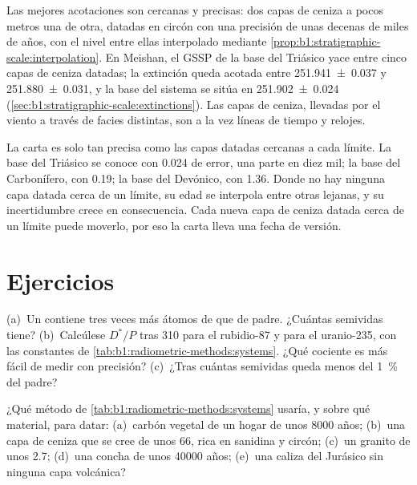 Las mejores acotaciones son cercanas y precisas: dos capas de ceniza a pocos metros una de otra, datadas en circón con una precisión de unas decenas de miles de años, con el nivel entre ellas interpolado mediante
\cref{prop:b1:stratigraphic-scale:interpolation}. En Meishan, el GSSP de la base del Triásico yace entre cinco capas de ceniza datadas; la extinción queda acotada entre \qty[uncertainty-mode=separate]{251.941(37)}{\Ma}
y \qty[uncertainty-mode=separate]{251.880(31)}{\Ma}, y la base del sistema se sitúa en \qty[uncertainty-mode=separate]{251.902(24)}{\Ma}
(\cref{sec:b1:stratigraphic-scale:extinctions}). Las capas de ceniza, llevadas por el viento a través de facies distintas, son a la vez líneas de tiempo y relojes.

La carta es solo tan precisa como las capas datadas cercanas a cada límite. La base del Triásico se conoce con \qty{0.024}{\Myr} de error, una parte en diez mil; la base del Carbonífero, con \qty{0.19}{\Myr}; la base del Devónico, con
\qty{1.36}{\Myr}. Donde no hay ninguna capa datada cerca de un límite, su edad se interpola entre otras lejanas, y su incertidumbre crece en consecuencia. Cada nueva capa de ceniza datada cerca de un límite puede moverlo, por eso la carta lleva una fecha de versión.

\section{Ejercicios}

\begin{exercise}[$\star$]\label{exo:b1:radiometric-methods:1}
(a)~Un  contiene tres veces más átomos de  que de padre. ¿Cuántas semividas tiene? (b)~Calcúlese $D^*/P$ tras
\qty{310}{\Myr} para el rubidio-87 y para el uranio-235, con las constantes de
\cref{tab:b1:radiometric-methods:systems}. ¿Qué cociente es más fácil de medir con precisión? (c)~¿Tras cuántas semividas queda menos del \qty{1}{\percent} del padre?
\end{exercise}

\begin{exercise}[$\star$]\label{exo:b1:radiometric-methods:2}
¿Qué método de \cref{tab:b1:radiometric-methods:systems} usaría, y sobre qué material, para datar: (a)~carbón vegetal de un hogar de unos \num{8000} años;
(b)~una capa de ceniza que se cree de unos \qty{66}{\Ma}, rica en sanidina y circón; (c)~un granito de unos \qty{2.7}{\Ga}; (d)~una concha de unos
\num{40000} años; (e)~una caliza del Jurásico sin ninguna capa volcánica?
\end{exercise}

